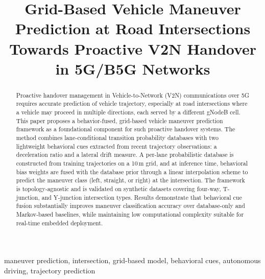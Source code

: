 \documentclass[conference]{IEEEtran}
\begin{document}
\title{Grid-Based Vehicle Maneuver Prediction at Road Intersections Towards Proactive V2N Handover in 5G/B5G Networks}

\author{
\and
{}
}

\maketitle

\begin{abstract}
Proactive handover management in Vehicle-to-Network (V2N) communications over 5G requires accurate prediction of vehicle trajectory, especially at road intersections where a vehicle may proceed in multiple directions, each served by a different gNodeB cell.
This paper proposes a behavior-fused, grid-based vehicle maneuver prediction framework as a foundational component for such proactive handover systems.
The method combines lane-conditional transition probability databases with two lightweight behavioral cues extracted from recent trajectory observations: a deceleration ratio and a lateral drift measure.
A per-lane probabilistic database is constructed from training trajectories on a 10\,m grid, and at inference time, behavioral bias weights are fused with the database prior through a linear interpolation scheme to predict the maneuver class (left, straight, or right) at the intersection.
The framework is topology-agnostic and is validated on synthetic datasets covering four-way, T-junction, and Y-junction intersection types.
Results demonstrate that behavioral cue fusion substantially improves maneuver classification accuracy over database-only and Markov-based baselines, while maintaining low computational complexity suitable for real-time embedded deployment.
\end{abstract}

\begin{IEEEkeywords}
maneuver prediction, intersection, grid-based model, behavioral cues, autonomous driving, trajectory prediction
\end{IEEEkeywords}
\end{document}
